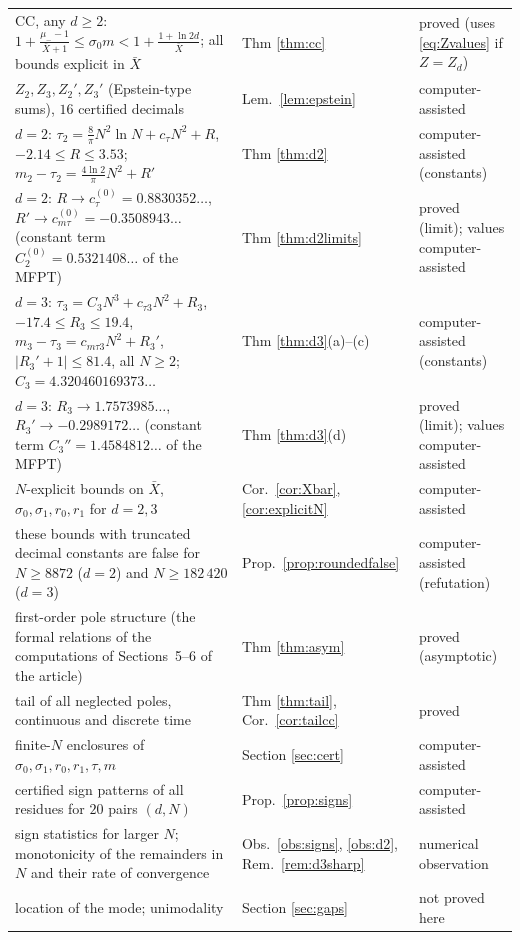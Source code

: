 \documentclass[11pt,a4paper]{article}
\newcommand{\Xb}{\bar X}
\theoremstyle{plain}
\theoremstyle{definition}
\numberwithin{equation}{section}
\begin{document}
\begin{center}
\begin{tabular}{p{}p{}p{}}
CC, any $d\ge2$: $1+\frac{\mu_--1}{\Xb+1}\le\sigma_0m<1+\frac{1+\ln2d}{\Xb}$; all bounds explicit in $\Xb$ & Thm \ref{thm:cc} & proved (uses \eqref{eq:Zvalues} if $Z=Z_d$)\\
$Z_2,Z_3,Z_2',Z_3'$ (Epstein-type sums), $16$ certified decimals & Lem.\ \ref{lem:epstein} & computer-assisted\\
$d=2$: $\tau_2=\frac8\pi N^2\ln N+c_\tau N^2+R$, $-2.14\le R\le3.53$; $m_2-\tau_2=\frac{4\ln2}\pi N^2+R'$ & Thm \ref{thm:d2} & computer-assisted (constants)\\
$d=2$: $R\to c^{(0)}_\tau=0.8830352\ldots$, $R'\to c^{(0)}_{m\tau}=-0.3508943\ldots$ (constant term $C_2^{(0)}=0.5321408\ldots$ of the MFPT) & Thm \ref{thm:d2limits} & proved (limit); values computer-assisted\\
$d=3$: $\tau_3=C_3N^3+c_{\tau3}N^2+R_3$, $-17.4\le R_3\le19.4$, $m_3-\tau_3=c_{m\tau3}N^2+R_3'$, $|R_3'+1|\le81.4$, all $N\ge2$; $C_3=4.320460169373\ldots$ & Thm \ref{thm:d3}(a)--(c) & computer-assisted (constants)\\
$d=3$: $R_3\to1.7573985\ldots$, $R_3'\to-0.2989172\ldots$ (constant term $C_3''=1.4584812\ldots$ of the MFPT) & Thm \ref{thm:d3}(d) & proved (limit); values computer-assisted\\
$N$-explicit bounds on $\Xb$, $\sigma_0,\sigma_1,r_0,r_1$ for $d=2,3$ & Cor.\ \ref{cor:Xbar}, \ref{cor:explicitN} & computer-assisted\\
these bounds with truncated decimal constants are false for $N\ge8872$ ($d=2$) and $N\ge182\,420$ ($d=3$) & Prop.\ \ref{prop:roundedfalse} & computer-assisted (refutation)\\
first-order pole structure (the formal relations of the computations of Sections~5--6 of the article) & Thm \ref{thm:asym} & proved (asymptotic)\\
tail of all neglected poles, continuous and discrete time & Thm \ref{thm:tail}, Cor.\ \ref{cor:tailcc} & proved\\
finite-$N$ enclosures of $\sigma_0,\sigma_1,r_0,r_1,\tau,m$ & Section \ref{sec:cert} & computer-assisted\\
certified sign patterns of all residues for $20$ pairs $(d,N)$ & Prop.\ \ref{prop:signs} & computer-assisted\\
sign statistics for larger $N$; monotonicity of the remainders in $N$ and their rate of convergence & Obs.\ \ref{obs:signs}, \ref{obs:d2}, Rem.\ \ref{rem:d3sharp} & numerical observation\\
location of the mode; unimodality & Section \ref{sec:gaps} & not proved here\\\bottomrule
\end{tabular}
\end{center}
\end{document}
